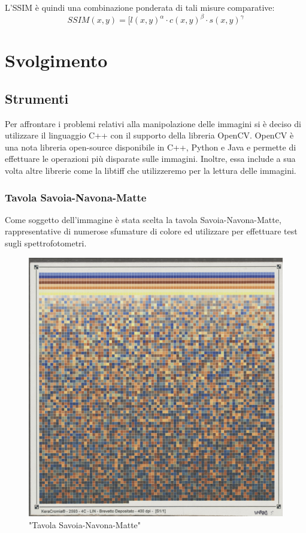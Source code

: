 \documentclass[a4paper,11pt]{article}
\begin{document}
    L'SSIM è quindi una combinazione ponderata di tali misure comparative:
    $$SSIM(x,y) = [l(x,y)^\alpha \cdot c(x,y)^\beta \cdot s(x,y)^\gamma$$
    
    \newpage

    \section{Svolgimento}

    \subsection{Strumenti}
    Per affrontare i problemi relativi alla manipolazione delle immagini si è deciso di utilizzare il linguaggio C++ con il supporto della libreria OpenCV.
    OpenCV è una nota libreria open-source disponibile in C++, Python e Java e permette di effettuare le operazioni più disparate sulle immagini.
    Inoltre, essa include a sua volta altre librerie come la libtiff che utilizzeremo per la lettura delle immagini.
    
    \subsubsection{Tavola Savoia-Navona-Matte}
    Come soggetto dell'immagine è stata scelta la tavola Savoia-Navona-Matte, rappresentative di numerose sfumature di colore ed utilizzare per effettuare test sugli spettrofotometri.

    \begin{figure}[h]
        \centering
        \includegraphics[scale=0.4]{tavola}
        \caption{"Tavola Savoia-Navona-Matte"}
    \end{figure}
\end{document}
